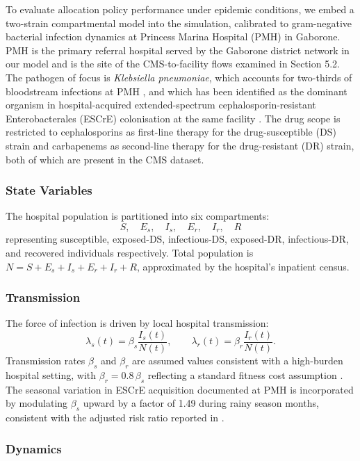 \documentclass{article}
\begin{document}
To evaluate allocation policy performance under epidemic conditions, we embed a two-strain compartmental model into the simulation, calibrated to gram-negative bacterial infection dynamics at Princess Marina Hospital (PMH) in Gaborone. PMH is the primary referral hospital served by the Gaborone district network in our model and is the site of the CMS-to-facility flows examined in Section 5.2. The pathogen of focus is \textit{Klebsiella pneumoniae}, which accounts for two-thirds of bloodstream infections at PMH \cite{gezmu2020}, and which has been identified as the dominant organism in hospital-acquired extended-spectrum cephalosporin-resistant Enterobacterales (ESCrE) colonisation at the same facility \cite{ntereke2026}. The drug scope is restricted to cephalosporins as first-line therapy for the drug-susceptible (DS) strain and carbapenems as second-line therapy for the drug-resistant (DR) strain, both of which are present in the CMS dataset.

\subsubsection{State Variables}

The hospital population is partitioned into six compartments:
\[
S, \quad E_s, \quad I_s, \quad E_r, \quad I_r, \quad R
\]
representing susceptible, exposed-DS, infectious-DS, exposed-DR, infectious-DR, and 
recovered individuals respectively. Total population is 
$N = S + E_s + I_s + E_r + I_r + R$, approximated by the hospital's inpatient 
census.

\subsubsection{Transmission}

The force of infection is driven by local hospital transmission:
\[
\lambda_s(t) = \beta_s \frac{I_s(t)}{N(t)}, 
\qquad 
\lambda_r(t) = \beta_r \frac{I_r(t)}{N(t)}.
\]
Transmission rates $\beta_s$ and $\beta_r$ are assumed values consistent with a high-burden hospital setting, with $\beta_r = 0.8\,\beta_s$ reflecting a standard fitness cost assumption \cite{kd20}. The seasonal variation in ESCrE acquisition documented at PMH \cite{ntereke2026} is incorporated by modulating $\beta_s$ upward by a factor of 1.49 during rainy season months, consistent with the adjusted risk ratio reported in \cite{ntereke2026}.

\subsubsection{Dynamics}
\end{document}
